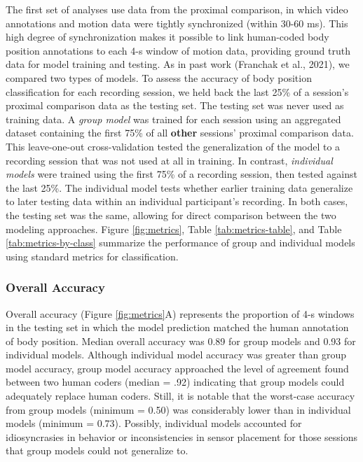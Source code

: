 \documentclass[
  man]{apa6}
\begin{document}
The first set of analyses use data from the proximal comparison, in which video annotations and motion data were tightly synchronized (within 30-60 ms). This high degree of synchronization makes it possible to link human-coded body position annotations to each 4-s window of motion data, providing ground truth data for model training and testing. As in past work (Franchak et al., 2021), we compared two types of models. To assess the accuracy of body position classification for each recording session, we held back the last 25\% of a session's proximal comparison data as the testing set. The testing set was never used as training data. A \emph{group model} was trained for each session using an aggregated dataset containing the first 75\% of all \textbf{other} sessions' proximal comparison data. This leave-one-out cross-validation tested the generalization of the model to a recording session that was not used at all in training. In contrast, \emph{individual models} were trained using the first 75\% of a recording session, then tested against the last 25\%. The individual model tests whether earlier training data generalize to later testing data within an individual participant's recording. In both cases, the testing set was the same, allowing for direct comparison between the two modeling approaches. Figure \ref{fig:metrics}, Table \ref{tab:metrics-table}, and Table \ref{tab:metrics-by-class} summarize the performance of group and individual models using standard metrics for classification.

\hypertarget{overall-accuracy}{%
\subsubsection{Overall Accuracy}\label{overall-accuracy}}

Overall accuracy (Figure \ref{fig:metrics}A) represents the proportion of 4-s windows in the testing set in which the model prediction matched the human annotation of body position. Median overall accuracy was 0.89 for group models and 0.93 for individual models. Although individual model accuracy was greater than group model accuracy, group model accuracy approached the level of agreement found between two human coders (median = .92) indicating that group models could adequately replace human coders. Still, it is notable that the worst-case accuracy from group models (minimum = 0.50) was considerably lower than in individual models (minimum = 0.73). Possibly, individual models accounted for idiosyncrasies in behavior or inconsistencies in sensor placement for those sessions that group models could not generalize to.
\end{document}
